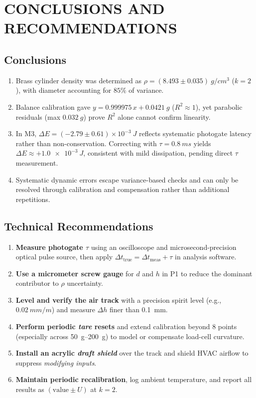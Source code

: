 \documentclass[a4paper, 12pt]{article}
\begin{document}
    \section{CONCLUSIONS AND RECOMMENDATIONS}
        \subsection{Conclusions}
        \begin{enumerate}
            \item Brass cylinder density was determined as $\rho=(8.493\pm0.035)\ \si{g/cm^3}$ ($k=2$), with diameter accounting for $85\%$ of variance.
            \item Balance calibration gave $y=0.999975\,x+0.0421\ \si{g}$ ($R^2\approx 1$), yet parabolic residuals (max $\SI{0.032}{g}$) prove $R^2$ alone cannot confirm linearity.
            \item In M3, $\Delta E=(-2.79\pm0.61)\times10^{-3}\ \si{J}$ reflects systematic photogate latency rather than non-conservation. Correcting with $\tau=\SI{0.8}{ms}$ yields $\Delta E\approx+\SI{1.0e-3}{J}$, consistent with mild dissipation, pending direct $\tau$ measurement.
            \item Systematic dynamic errors escape variance-based checks and can only be resolved through calibration and compensation rather than additional repetitions.
        \end{enumerate}

        \subsection{Technical Recommendations}
        \begin{enumerate}
            \item \textbf{Measure photogate $\tau$} using an oscilloscope and microsecond-precision optical pulse source, then apply $\Delta t_{\mathrm{true}}=\Delta t_{\mathrm{meas}}+\tau$ in analysis software.
            \item \textbf{Use a micrometer screw gauge} for $d$ and $h$ in P1 to reduce the dominant contributor to $\rho$ uncertainty.
            \item \textbf{Level and verify the air track} with a precision spirit level (e.g., $\SI{0.02}{mm/m}$) and measure $\Delta h$ finer than \SI{0.1}{mm}.
            \item \textbf{Perform periodic \textit{tare} resets} and extend calibration beyond $8$ points (especially across \SIrange{50}{200}{g}) to model or compensate load-cell curvature.
            \item \textbf{Install an acrylic \textit{draft shield}} over the track and shield HVAC airflow to suppress \textit{modifying inputs}.
            \item \textbf{Maintain periodic recalibration}, log ambient temperature, and report all results as $(\text{value}\pm U)$ at $k=2$.
        \end{enumerate}
\end{document}
